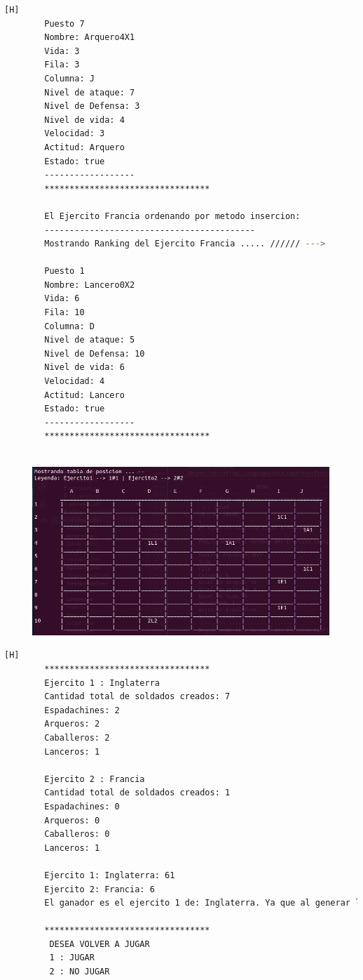 \documentclass{article}
\begin{document}
\begin{lstlisting}[language=bash,caption={Ejecucion:}][H]
		Puesto 7
		Nombre: Arquero4X1
		Vida: 3
		Fila: 3
		Columna: J
		Nivel de ataque: 7
		Nivel de Defensa: 3
		Nivel de vida: 4
		Velocidad: 3
		Actitud: Arquero
		Estado: true
		------------------
		*********************************
		
		El Ejercito Francia ordenando por metodo insercion: 
		------------------------------------------
		Mostrando Ranking del Ejercito Francia ..... ////// --->
		
		Puesto 1
		Nombre: Lancero0X2
		Vida: 6
		Fila: 10
		Columna: D
		Nivel de ataque: 5
		Nivel de Defensa: 10
		Nivel de vida: 6
		Velocidad: 4
		Actitud: Lancero
		Estado: true
		------------------
		*********************************
		
	\end{lstlisting}
	\begin{figure}[H]
		\centering
		\includegraphics[width=1.0\textwidth,keepaspectratio]{img/Commit11.png}
	\end{figure}
	\begin{lstlisting}[language=bash,caption={Ejecucion:}][H]
		*********************************
		Ejercito 1 : Inglaterra
		Cantidad total de soldados creados: 7
		Espadachines: 2
		Arqueros: 2
		Caballeros: 2
		Lanceros: 1
		
		Ejercito 2 : Francia
		Cantidad total de soldados creados: 1
		Espadachines: 0
		Arqueros: 0
		Caballeros: 0
		Lanceros: 1
		
		Ejercito 1: Inglaterra: 61
		Ejercito 2: Francia: 6
		El ganador es el ejercito 1 de: Inglaterra. Ya que al generar los porcentajes de probabilidad de victoria basada en los niveles de vida de sus soldados y aplicando un experimento aleatorio salio vencedor. (Aleatorio generado : 91.04)
		
		*********************************
		 DESEA VOLVER A JUGAR
		 1 : JUGAR
		 2 : NO JUGAR		
		
	\end{lstlisting}
\end{document}
